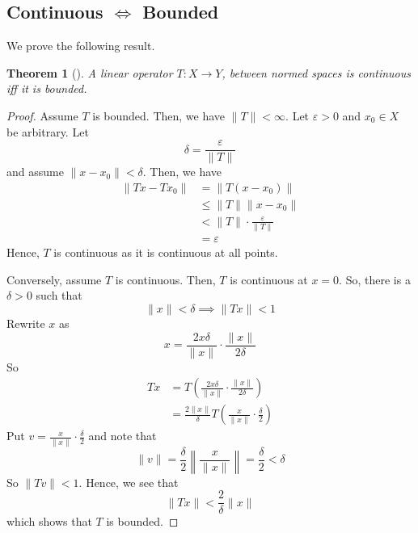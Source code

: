 \documentclass{article}
\theoremstyle{plain}
\newtheorem{thrm}{Theorem}
\theoremstyle{definition}
\begin{document}
		\subsection{Continuous $\iff$ Bounded} 
		We prove the following result. 
		\begin{thrm}[]
				A linear operator $T: X\to Y$, between normed spaces is continuous iff it is bounded. 
		\end{thrm}
		\begin{proof}
				Assume $T$ is bounded. Then, we have $\|T\| < \infty$. Let $\varepsilon > 0$ and $x_0\in X$ be arbitrary. Let 
				\begin{equation*}
						\delta = \frac{\varepsilon}{\|T\|}
				\end{equation*}
				and assume $\|x - x_0\| < \delta$. Then, we have 
				\begin{align*}
						\|Tx - Tx_0\| &= \|T(x - x_0)\| \\ 
													&\leq \|T\|\|x - x_0\| \\ 
													&< \|T\| \cdot \frac{\varepsilon}{\|T\|} \\ 
													&= \varepsilon
				\end{align*}
				Hence, $T$ is continuous as it is continuous at all points. \par 

				Conversely, assume $T$ is continuous. Then, $T$ is continuous at $x = 0$. So, there is a $\delta > 0$ such that 
				\begin{equation*}
						\|x\| < \delta \implies \|Tx\| < 1
				\end{equation*}
				Rewrite $x$ as 
				\begin{equation*}
						x = \frac{2x \delta}{\|x\|} \cdot \frac{\|x\|}{2 \delta}
				\end{equation*}
				So 
				\begin{align*}
						Tx &= T \left( \frac{2x \delta}{\|x\|} \cdot \frac{\|x\|}{2 \delta} \right) \\ 
							 &= \frac{2\|x\|}{\delta} T \left( \frac{x}{\|x\|} \cdot \frac{\delta}{2} \right)
				\end{align*}
				Put $v = \frac{x}{\|x\|} \cdot \frac{\delta}{2}$ and note that 
				\begin{equation*}
						\|v\| = \frac{\delta}{2} \left\| \frac{x}{\|x\|} \right\| = \frac{\delta}{2} < \delta
				\end{equation*}
				So $\|Tv\| < 1$. Hence, we see that 
				\begin{equation*}
						\|Tx\| < \frac{2}{\delta}\|x\|
				\end{equation*}
				which shows that $T$ is bounded. 
		\end{proof}
\end{document}
